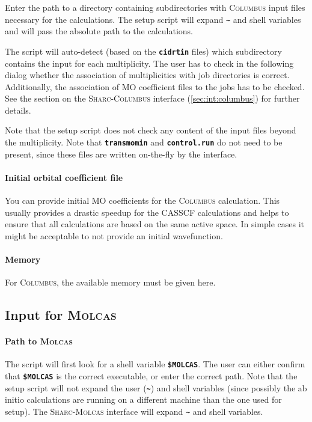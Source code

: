 \documentclass[a4paper,11pt,DIV=15,openany,twoside=false]{scrbook}
\newcommand{\sharc}{\textsc{Sharc}}
\newcommand{\ttt}[1]{\textbf{\texttt{#1}}}
\begin{document}
Enter the path to a directory containing subdirectories with \textsc{Columbus} input files necessary for the calculations. The setup script will expand \ttt{\textasciitilde} and shell variables and will pass the absolute path to the calculations.

The script will auto-detect (based on the \ttt{cidrtin} files) which subdirectory contains the input for each multiplicity. The user has to check in the following dialog whether the association of multiplicities with job directories is correct. Additionally, the association of MO coefficient files to the jobs has to be checked. See the section on the \sharc-\textsc{Columbus} interface (\ref{sec:int:columbus}) for further details. 

Note that the setup script does not check any content of the input files beyond the multiplicity. Note that \ttt{transmomin} and \ttt{control.run} do not need to be present, since these files are written on-the-fly by the interface. 

\paragraph{Initial orbital coefficient file}

You can provide initial MO coefficients for the \textsc{Columbus} calculation. This usually provides a drastic speedup for the CASSCF calculations and helps to ensure that all calculations are based on the same active space. In simple cases it might be acceptable to not provide an initial wavefunction.

\paragraph{Memory}

For \textsc{Columbus}, the available memory must be given here. 

\subsection{Input for \textsc{Molcas}}

\paragraph{Path to \textsc{Molcas}}

The script will first look for a shell variable \ttt{\$MOLCAS}. The user can either confirm that \ttt{\$MOLCAS} is the correct executable, or enter the correct path. Note that the setup script will not expand the user (\ttt{\textasciitilde}) and shell variables (since possibly the ab initio calculations are running on a different machine than the one used for setup). The \sharc-\textsc{Molcas} interface will expand \ttt{\textasciitilde} and shell variables.
\end{document}
